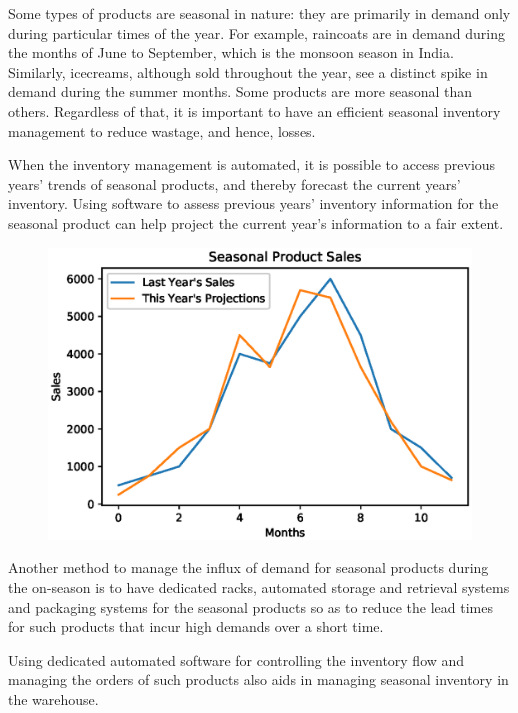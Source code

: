 \documentclass{report}
\begin{document}
Some types of products are seasonal in nature: they are primarily in demand only during particular times of the year. For example, raincoats are in demand during the months of June to September, which is the monsoon season in India. Similarly, icecreams, although sold throughout the year, see a distinct spike in demand during the summer months. Some products are more seasonal than others. Regardless of that, it is important to have an efficient seasonal inventory management to reduce wastage, and hence, losses.

When the inventory management is automated, it is possible to access previous years' trends of seasonal products, and thereby forecast the current years' inventory. Using software to assess previous years' inventory information for the seasonal product can help project the current year's information to a fair extent. 

\begin{figure}[H]
    
    \centering
    \includegraphics[scale=0.5]{seasonal.eps}
    \caption{}
    
\end{figure}

Another method to manage the influx of demand for seasonal products during the on-season is to have dedicated racks, automated storage and retrieval systems and packaging systems for the seasonal products so as to reduce the lead times for such products that incur high demands over a short time.

Using dedicated automated software for controlling the inventory flow and managing the orders of such products also aids in managing seasonal inventory in the warehouse.
\end{document}

